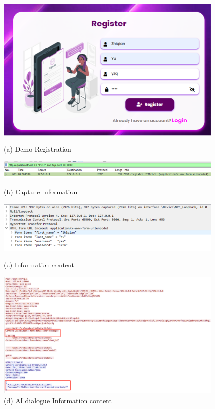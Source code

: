 \documentclass{article}
\begin{document}
\begin{figure}[htb]
    \centering
    \begin{minipage}{0.5\textwidth}
        \centering
        \includegraphics[width=\textwidth]{images/Demo Registration.png}
        \caption*{(a) Demo Registration}
    \end{minipage}
    \hfill
    \begin{minipage}{0.5\textwidth}
        \centering
        \includegraphics[width=\textwidth]{images/Capture Information.png}
        \caption*{(b) Capture Information}
    \end{minipage}
    \hfill
    \begin{minipage}{0.5\textwidth}
        \centering
        \includegraphics[width=\textwidth]{images/Information content.png}
        \caption*{(c) Information content}
    \end{minipage}
    \hfill
    \begin{minipage}{0.5\textwidth}
        \centering
        \includegraphics[width=\textwidth]{images/AI dialogue Information content.png}
        \caption*{(d) AI dialogue Information content}
    \end{minipage}
    

\end{figure}
\end{document}
